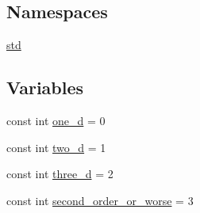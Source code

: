 \subsection*{Namespaces}
\begin{DoxyCompactItemize}
\item 
\hyperlink{namespacestd}{std}
\end{DoxyCompactItemize}
\subsection*{Variables}
\begin{DoxyCompactItemize}
\item 
const int \hyperlink{tds_8hh_a88231a35b839c2381929e567f85b4a18}{one\-\_\-d} = 0
\item 
const int \hyperlink{tds_8hh_a3026d66c175dfab197999c3aa65f6b55}{two\-\_\-d} = 1
\item 
const int \hyperlink{tds_8hh_a8666c0e8e18ef6e03200f38bb07c551f}{three\-\_\-d} = 2
\item 
const int \hyperlink{tds_8hh_ab1496fd546727f3adb6f747b949ca321}{second\-\_\-order\-\_\-or\-\_\-worse} = 3
\end{DoxyCompactItemize}


